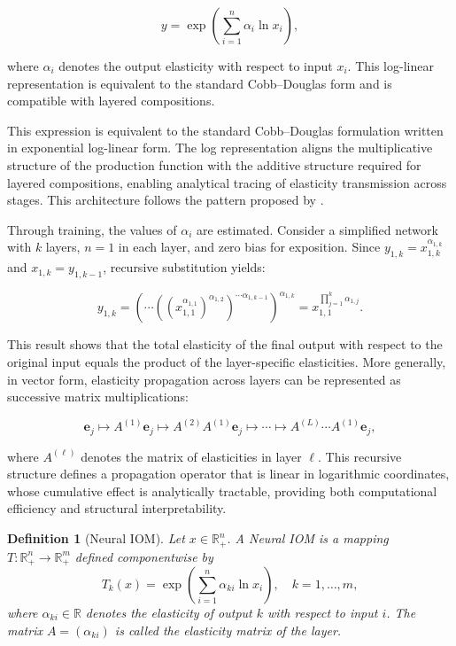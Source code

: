 \documentclass[preprint,12pt,authoryear]{sn-jnl}
\newtheorem{definition}{Definition}
\begin{document}
\begin{equation} \label{log_cobb_douglas_1}
y = \exp\left( \sum_{i=1}^n \alpha_i \ln x_i \right),
\end{equation}

where $\alpha_i$ denotes the output elasticity with respect to input $x_i$. This log-linear representation is equivalent to the standard Cobb--Douglas form and is compatible with layered compositions.

This expression is equivalent to the standard Cobb–Douglas formulation written in exponential log-linear form. The log representation aligns the multiplicative structure of the production function with the additive structure required for layered compositions, enabling analytical tracing of elasticity transmission across stages. This architecture follows the pattern proposed by \cite{bas2016training}.

Through training, the values of $\alpha_i$ are estimated. Consider a simplified network with $k$ layers, $n=1$ in each layer, and zero bias for exposition. Since $y_{1,k} = x_{1,k}^{\alpha_{1,k}}$ and $x_{1,k} = y_{1,k-1}$, recursive substitution yields:

\begin{equation} \label{cobb_douglas_composition}
y_{1,k} 
= \left( \cdots \left( \left( x_{1,1}^{\alpha_{1,1}} \right)^{\alpha_{1,2}} \right)^{\cdots \alpha_{1,k-1}} \right)^{\alpha_{1,k}}
= x_{1,1}^{\prod_{j=1}^{k} \alpha_{1,j}}.
\end{equation}

This result shows that the total elasticity of the final output with respect to the original input equals the product of the layer-specific elasticities. More generally, in vector form, elasticity propagation across layers can be represented as successive matrix multiplications:

\[
\mathbf{e}_j \longmapsto A^{(1)} \mathbf{e}_j \longmapsto A^{(2)} A^{(1)} \mathbf{e}_j \longmapsto \cdots \longmapsto A^{(L)} \cdots A^{(1)} \mathbf{e}_j,
\]

where $A^{(\ell)}$ denotes the matrix of elasticities in layer $\ell$. This recursive structure defines a propagation operator that is linear in logarithmic coordinates, whose cumulative effect is analytically tractable, providing both computational efficiency and structural interpretability. 

\begin{definition}[Neural IOM] \label{def:neural_iom}
Let $x \in \mathbb{R}^n_{+}$. A Neural IOM is a mapping $T: \mathbb{R}^n_{+} \to \mathbb{R}^m_{+}$ defined componentwise by
\[
T_k(x) = \exp\left( \sum_{i=1}^n \alpha_{ki} \ln x_i \right), \quad k = 1, \dots, m,
\]
where $\alpha_{ki} \in \mathbb{R}$ denotes the elasticity of output $k$ with respect to input $i$. The matrix $A = (\alpha_{ki})$ is called the elasticity matrix of the layer.
\end{definition}
\end{document}
